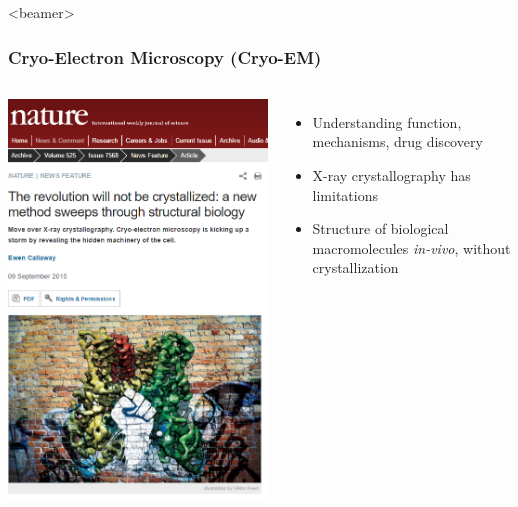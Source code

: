 \documentclass{beamer}
\begin{document}
\begin{frame}<beamer>
\frametitle{Cryo-Electron Microscopy (Cryo-EM)}
\begin{columns}
\centering
\includegraphics[scale=0.35]{figures/nature_news.png}
\begin{itemize}
\item Understanding function, mechanisms, drug discovery
\item X-ray crystallography has limitations
\item Structure of biological macromolecules \textit{in-vivo}, without crystallization
\end{itemize}
\end{columns}
\end{frame}
\end{document}
